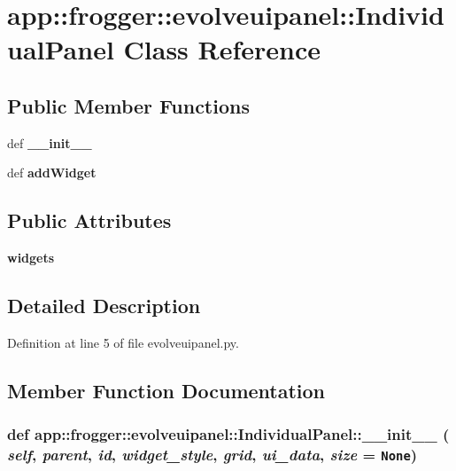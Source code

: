 \section{app::frogger::evolveuipanel::IndividualPanel Class Reference}
\label{classapp_1_1frogger_1_1evolveuipanel_1_1IndividualPanel}
\subsection*{Public Member Functions}
\begin{CompactItemize}
\item 
def {\bf \_\-\_\-init\_\-\_\-}
\item 
def {\bf addWidget}
\end{CompactItemize}
\subsection*{Public Attributes}
\begin{CompactItemize}
\item 
{\bf widgets}
\end{CompactItemize}


\subsection{Detailed Description}


Definition at line 5 of file evolveuipanel.py.

\subsection{Member Function Documentation}
\subsubsection{\setlength{\rightskip}{0pt plus 5cm}def app::frogger::evolveuipanel::IndividualPanel::\_\-\_\-init\_\-\_\- ( {\em self},  {\em parent},  {\em id},  {\em widget\_\-style},  {\em grid},  {\em ui\_\-data},  {\em size} = {\tt None})}\label{classapp_1_1frogger_1_1evolveuipanel_1_1IndividualPanel_7191a79279de33c557514e3d71bb4689}




